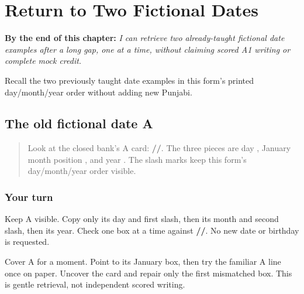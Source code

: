 
\chapter{Return to Two Fictional Dates}
\label{ch:pa-two-date-forms-r4}

\begin{chapteropening}
\textbf{By the end of this chapter:} \emph{I can retrieve two already-taught fictional date examples after a long gap, one at a time, without claiming scored A1 writing or complete mock credit.}

Recall the two previously taught date examples in this form's printed day/month/year order without adding new Punjabi.
\end{chapteropening}

\section[\texorpdfstring{\pa{੧੫}/\pa{੦੧}/\pa{੨੦੨੫} (fictional January date A)}{੧੫/੦੧/੨੦੨੫ (fictional January date A)}]{The old fictional date A}

\label{lesson:PA-R169-date-a-again}



\begin{quote}
Look at the closed bank's A card: \textbf{//}. The three pieces are day \textbf{}, January month position \textbf{}, and year \textbf{}. The slash marks keep this form's day/month/year order visible.
\end{quote}

\subsection*{Your turn}
Keep A visible. Copy only its day and first slash, then its month and second slash, then its year. Check one box at a time against \textbf{//}. No new date or birthday is requested.

\begin{tcolorbox}[breakable,colback=teal!4,colframe=teal!35!black,title={Before you move on}]
Cover A for a moment. Point to its January box, then try the familiar A line once on paper. Uncover the card and repair only the first mismatched box. This is gentle retrieval, not independent scored writing.
\end{tcolorbox}

